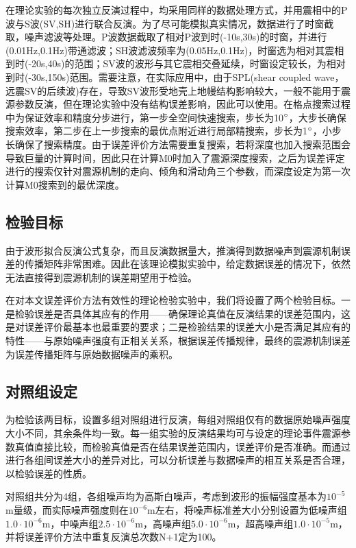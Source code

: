 在理论实验的每次独立反演过程中，均采用同样的数据处理方式，并用震相中的P波与S波(SV,SH)进行联合反演。为了尽可能模拟真实情况，数据进行了时窗截取，噪声滤波等处理。P波数据截取了相对P波到时(-10s,30s)的时窗，并进行(0.01Hz,0.1Hz)带通滤波；SH波滤波频率为(0.05Hz,0.1Hz)，时窗选为相对其震相到时(-20s,40s)的范围；SV波的波形与其它震相交叠延续，时窗设定较长，为相对到时(-30s,150s)范围。需要注意，在实际应用中，由于SPL(shear coupled wave，远震SV的后续波)存在，导致SV波形受地壳上地幔结构影响较大，一般不能用于震源参数反演\citep{Aki1980}，但在理论实验中没有结构误差影响，因此可以使用。在格点搜索过程中为保证效率和精度分步进行，第一步全空间快速搜索，步长为10$^\circ$，大步长确保搜索效率，第二步在上一步搜索的最优点附近进行局部精搜索，步长为1$^\circ$，小步长确保了搜索精度。由于误差评价方法需要重复搜索，若将深度也加入搜索范围会导致巨量的计算时间，因此只在计算M0时加入了震源深度搜索，之后为误差评定进行的搜索仅针对震源机制的走向、倾角和滑动角三个参数，而深度设定为第一次计算M0搜索到的最优深度。

\subsection{检验目标}
由于波形拟合反演公式复杂，而且反演数据量大，推演得到数据噪声到震源机制误差的传播矩阵非常困难。因此在该理论模拟实验中，给定数据误差的情况下，依然无法直接得到震源机制的误差期望用于检验。

在对本文误差评价方法有效性的理论检验实验中，我们将设置了两个检验目标。一是检验误差是否具体其应有的作用——确保理论真值在反演结果的误差范围内，这是对误差评价最基本也最重要的要求；二是检验结果的误差大小是否满足其应有的特性——与原始噪声强度有正相关关系，根据误差传播规律，最终的震源机制误差为误差传播矩阵与原始数据噪声的乘积。

\subsection{对照组设定}
为检验该两目标，设置多组对照组进行反演，每组对照组仅有的数据原始噪声强度大小不同，其余条件均一致。每一组实验的反演结果均可与设定的理论事件震源参数真值直接比较，而检验真值是否在结果误差范围内，误差评价是否准确。而通过进行各组间误差大小的差异对比，可以分析误差与数据噪声的相互关系是否合理，以检验误差的性质。

对照组共分为4组，各组噪声均为高斯白噪声，考虑到波形的振幅强度基本为$10^{-5}$m量级，而实际噪声强度则在$10^{-6}$m左右，将噪声标准差大小分别设置为低噪声组$1.0\cdot10^{-6}$m，中噪声组$2.5\cdot10^{-6}$m，高噪声组$5.0\cdot10^{-6}$m，超高噪声组$1.0\cdot10^{-5}$m，并将误差评价方法中重复反演总次数N+1定为100。

